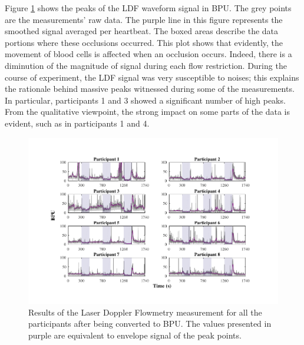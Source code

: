 Figure \ref{fig:LDF flow} shows the peaks of the LDF waveform signal in BPU. The grey points are the measurements' raw data. The purple line in this figure represents the smoothed signal averaged per heartbeat. The boxed areas describe the data portions where these occlusions occurred. This plot shows that evidently, the movement of blood cells is affected when an occlusion occurs. Indeed, there is a diminution of the magnitude of signal during each flow restriction. During the course of experiment, the LDF signal was very susceptible to noises; this explains the rationale behind massive peaks witnessed during some of the measurements. In particular, participants 1 and 3 showed a significant number of high peaks. From the qualitative viewpoint, the strong impact on some parts of the data is evident, such as in participants 1 and 4.

\begin{figure}[!htb]
	\centering
	\includegraphics[width=\textwidth,keepaspectratio,trim={1cm 0cm 1.5cm 0cm},clip]{figure_cmp_3}    
	\caption[Results of the LDF in BPU]{Results of the Laser Doppler Flowmetry measurement for all the participants after being converted to BPU. The values presented in purple are equivalent to envelope signal of the peak points.}
	\label{fig:LDF flow}
\end{figure}

